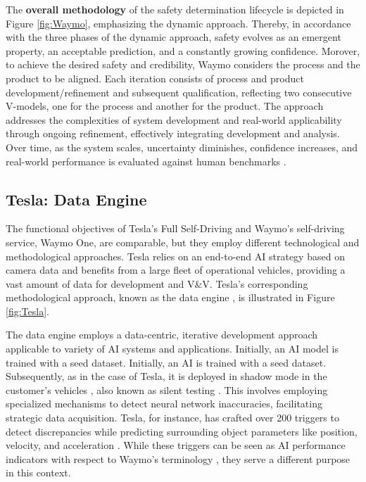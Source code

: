 The \textbf{overall methodology} of the safety determination lifecycle is depicted in Figure \ref{fig:Waymo}, emphasizing the dynamic approach. Thereby, in accordance with the three phases of the dynamic approach, safety evolves as an emergent property, an acceptable prediction, and a constantly growing confidence. Morover, to achieve the desired safety and credibility, Waymo considers the process and the product to be aligned. Each iteration consists of process and product development/refinement and subsequent qualification, reflecting two consecutive V-models, one for the process and another for the product. The approach addresses the complexities of system development and real-world applicability through ongoing refinement, effectively integrating development and analysis. Over time, as the system scales, uncertainty diminishes, confidence increases, and real-world performance is evaluated against human benchmarks \cite{di2023comparative, kusano2023comparison}.

\subsection{Tesla: Data Engine}\label{Tesla}

The functional objectives of Tesla's Full Self-Driving and Waymo's self-driving service, Waymo One, are comparable, but they employ different technological and methodological approaches. Tesla relies on an end-to-end AI strategy based on camera data and benefits from a large fleet of operational vehicles, providing a vast amount of data for development and V\&V. Tesla's corresponding methodological approach, known as the data engine \cite{karpathy_cvpr21}, is illustrated in Figure \ref{fig:Tesla}. 

The data engine employs a data-centric, iterative development approach applicable to variety of AI systems and applications. Initially, an AI model is trained with a seed dataset. Initially, an AI is trained with a seed dataset. Subsequently, as in the case of Tesla, it is deployed in shadow mode in the customer's vehicles \cite{Tesla_shadow}, also known as silent testing \cite{templeton2019}. This involves employing specialized mechanisms to detect neural network inaccuracies, facilitating strategic data acquisition. Tesla, for instance, has crafted over 200 triggers to detect discrepancies while predicting surrounding object parameters like position, velocity, and acceleration \cite{karpathy_cvpr21}. While these triggers can be seen as AI performance indicators with respect to Waymo's terminology \cite{favaro2023building}, they serve a different purpose in this context.

